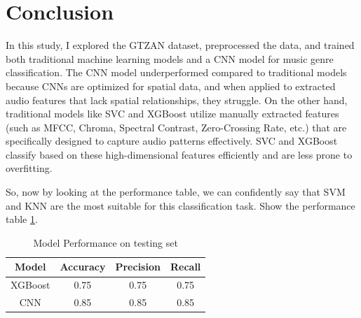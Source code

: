 \documentclass[11.5pt]{article}
\begin{document}
\section{Conclusion} \label{sec:conclusion}
In this study, I explored the GTZAN dataset, preprocessed the data, and trained both traditional machine learning models and a CNN model for music genre classification. The CNN model underperformed compared to traditional models because CNNs are optimized for spatial data, and when applied to extracted audio features that lack spatial relationships, they struggle. On the other hand, traditional models like SVC and XGBoost utilize manually extracted features (such as MFCC, Chroma, Spectral Contrast, Zero-Crossing Rate, etc.) that are specifically designed to capture audio patterns effectively. SVC and XGBoost classify based on these high-dimensional features efficiently and are less prone to overfitting.

So, now by looking at the performance table, we can confidently say that SVM and KNN are the most suitable for this classification task. Show the performance table \ref{tab:performance}.
\begin{table}[h]
    \centering
    \begin{tabular}{cccc}
        \toprule
        \textbf{Model} & \textbf{Accuracy} & \textbf{Precision} & \textbf{Recall} \\
        \midrule
        XGBoost        & 0.75              & 0.75               & 0.75            \\
        CNN            & 0.85              & 0.85               & 0.85            \\
        \bottomrule
    \end{tabular}
    \caption{Model Performance on testing set}
    \label{tab:performance}
\end{table}

\clearpage
\printbibliography[heading=bibintoc, title = {References}]
\end{document}

